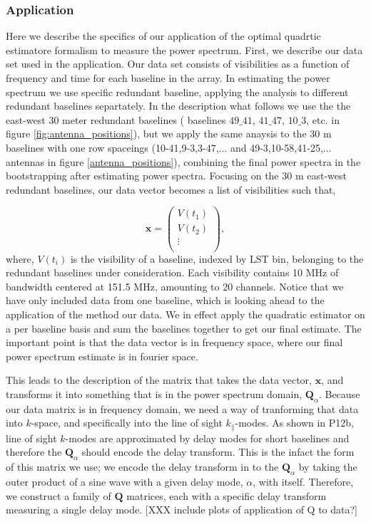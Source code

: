 \documentclass[twocolumn,numberedappendix]{emulateapj} \shorttitle{PSA64}
\begin{document}
\subsubsection{Application}
\label{sec:oqe_app}

Here we describe the specifics of our application of the optimal quadrtic
estimatore formalism to measure the power spectrum. First, we describe our data
set used in the application. Our data set consists of visibilities as a function
of frequency and time for each baseline in the array. In estimating the power
spectrum we use specific redundant baseline, applying the analysis to
different redundant baselines separtately. In the description what follows we
use the the east-west 30 meter redundant baselines ( baselines $49\_41$,
$41\_47$, $10\_3$, etc. in figure \ref{fig:antenna_positions}), but we apply the
same anaysis to the 30 m baselines with one row spaceings (10-41,9-3,3-47,...
and 49-3,10-58,41-25,... antennas in figure \ref{antenna_positions}), combining
the final power spectra in the bootstrapping after estimating power spectra.
Focusing on the 30 m east-west redundant baselines, our data vector becomes a
list of visibilities such that, 

\begin{equation}
\label{eqn:xvectdef}
\mathbf{x} = \left( \begin{array}{c}
V (t_{1}) \\
V (t_{2}) \\
\vdots \\
\end{array}
\right), 
\end{equation}
where, $V(t_{i})$ is the visibility of a baseline, indexed by LST bin,
belonging to the redundant baselines under consideration. Each visibility
contains 10 MHz of bandwidth centered at 151.5 MHz, amounting to 20 channels. 
Notice that we have only included data from one baseline, which is looking ahead
to the application of the method our data. We in effect apply the quadratic
estimator on a per baseline basis and sum the baselines together to get our
final estimate. The important point is that the data vector is in frequency
space, where our final power spectrum estimate is in fourier space. 

This leads to the description of the matrix that takes the data vector,
$\mathbf{x}$, and transforms it into something that is in the power spectrum
domain, $\mathbf{Q}_{\alpha}$. Because our data matrix is in frequency domain,
we need a way of tranforming that data into $k$-space, and specifically into
the line of sight $k_{\parallel}$-modes. As shown in P12b,
line of sight $k$-modes are approximated by delay modes for short baselines and
therefore the $\mathbf{Q}_{\alpha}$ should encode the delay transform. This is
the infact the form of this matrix we use; we encode the delay transform in to
the $\mathbf{Q}_{\alpha}$ by taking the outer product of a sine wave with a
given delay mode, $\alpha$,  with itself.  Therefore, we construct a family of
$\mathbf{Q}$ matrices, each with a specific delay transform measuring a single
delay mode. [XXX include plots of application of Q to data?]
\end{document}
